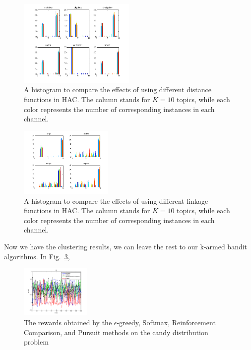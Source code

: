 \documentclass[conference]{IEEEtran}
\begin{document}
\begin{figure}[h]
	\center	
	\includegraphics[width=0.5\textwidth]{fig/hac_dists.png}
	\caption{A histogram to compare the effects of using different distance functions in HAC. The column stands for $K=10$ topics, while each color represents the number of corresponding instances in each channel.}
	\label{hac_dists}
\end{figure}

\begin{figure}[h]
	\center	
	\includegraphics[width=0.4\textwidth]{fig/hac_links.png}
	\caption{A histogram to compare the effects of using different linkage functions in HAC. The column stands for $K=10$ topics, while each color represents the number of corresponding instances in each channel.}
	\label{hac_links}
\end{figure}

Now we have the clustering results, we can leave the rest to our k-armed bandit algorithms. In Fig.~\ref{sutton_candy_r}, 

\begin{figure}[h]
	\center	
	\includegraphics[width=0.3\textwidth]{fig/sutton_candy_r.png}
	\caption{The rewards obtained by the $\epsilon$-greedy, Softmax, Reinforcement Comparison, and Pursuit methods on the candy distribution problem}
	\label{sutton_candy_r}
\end{figure}
\end{document}

